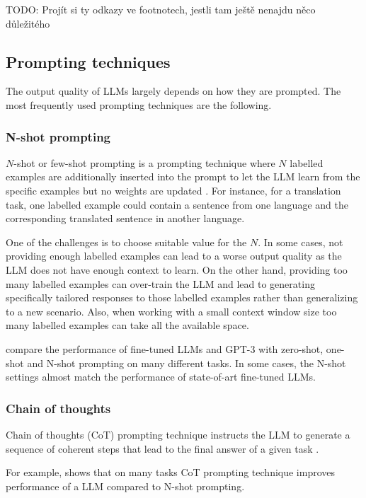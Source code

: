 TODO: Projít si ty odkazy ve footnotech, jestli tam ještě nenajdu něco důležitého \\


\subsection{Prompting techniques}

The output quality of LLMs largely depends on how they are prompted. The most frequently used prompting techniques are the following.


\subsubsection{N-shot prompting}

$N$-shot or few-shot prompting is a prompting technique where $N$ labelled examples are additionally inserted into the prompt to let the LLM learn from the specific examples but no weights are updated \cite{Brown2020}. For instance, for a translation task, one labelled example could contain a sentence from one language and the corresponding translated sentence in another language.

One of the challenges is to choose suitable value for the $N$. In some cases, not providing enough labelled examples can lead to a worse output quality as the LLM does not have enough context to learn. On the other hand, providing too many labelled examples can over-train the LLM and lead to generating specifically tailored responses to those labelled examples rather than generalizing to a new scenario. Also, when working with a small context window size too many labelled examples can take all the available space.

\citet{Brown2020} compare the performance of fine-tuned LLMs and GPT-3 with zero-shot, one-shot and N-shot prompting on many different tasks. In some cases, the N-shot settings almost match the performance of state-of-art fine-tuned LLMs.


\subsubsection{Chain of thoughts}

Chain of thoughts (CoT) prompting technique instructs the LLM to generate a sequence of coherent steps that lead to the final answer of a given task \cite{Wei2022}.

For example, \citet{Wei2022} shows that on many tasks CoT prompting technique improves performance of a LLM compared to N-shot prompting. \\

